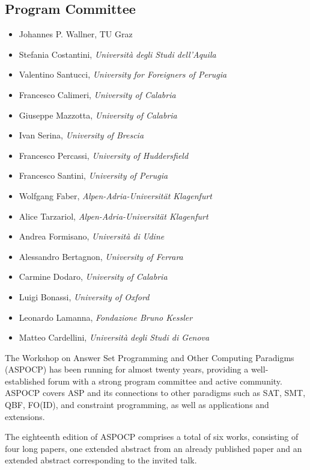 \documentclass[
]{ceurart}
\begin{document}
\subsection*{Program Committee}
\begin{itemize}
  \item Johannes P. Wallner, TU Graz
  \item Stefania Costantini, \emph{Università degli Studi dell'Aquila}
  \item Valentino Santucci, \emph{University for Foreigners of Perugia}
  \item Francesco Calimeri, \emph{University of Calabria}
  \item Giuseppe Mazzotta, \emph{University of Calabria}
  \item Ivan Serina, \emph{University of Brescia}
  \item Francesco Percassi, \emph{University of Huddersfield}
  \item Francesco Santini, \emph{University of Perugia}
  \item Wolfgang Faber, \emph{Alpen-Adria-Universität Klagenfurt}
  \item Alice Tarzariol, \emph{Alpen-Adria-Universität Klagenfurt}
  \item Andrea Formisano, \emph{Università di Udine}
  \item Alessandro Bertagnon, \emph{University of Ferrara}
  \item Carmine Dodaro, \emph{University of Calabria}
  \item Luigi Bonassi, \emph{University of Oxford}
  \item Leonardo Lamanna, \emph{Fondazione Bruno Kessler}
  \item Matteo Cardellini, \emph{Università degli Studi di Genova}
\end{itemize}



\noindent
The Workshop on Answer Set Programming and Other Computing Paradigms (ASPOCP) has been running for almost twenty years, providing a well-established forum with a strong program committee and active community. ASPOCP covers ASP and its connections to other paradigms such as SAT, SMT, QBF, FO(ID), and constraint programming, as well as applications and extensions.

The eighteenth edition of ASPOCP comprises a total of six works, consisting of four long papers, one extended abstract from an already published paper and an extended abstract corresponding to the invited talk.
\end{document}
